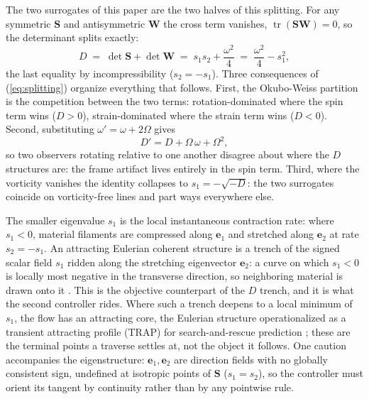 \documentclass[lettersize,journal]{IEEEtran}
\begin{document}
The two surrogates of this paper are the two halves of this splitting.
For any symmetric $\mathbf{S}$ and antisymmetric $\mathbf{W}$ the cross
term vanishes, $\operatorname{tr}(\mathbf{S}\mathbf{W}) = 0$, so the
determinant splits exactly:
\begin{equation}
    D \;=\; \det\mathbf{S} + \det\mathbf{W}
      \;=\; s_1 s_2 + \frac{\omega^2}{4}
      \;=\; \frac{\omega^2}{4} - s_1^2,
    \label{eq:splitting}
\end{equation}
the last equality by incompressibility ($s_2 = -s_1$). Three
consequences of (\ref{eq:splitting}) organize everything that follows.
First, the Okubo-Weiss partition is the competition between the two
terms: rotation-dominated where the spin term wins ($D > 0$),
strain-dominated where the strain term wins ($D < 0$). Second,
substituting $\omega' = \omega + 2\Omega$ gives
\begin{equation}
    D' = D + \Omega\,\omega + \Omega^2,
    \label{eq:D_not_objective}
\end{equation}
so two observers rotating relative to one another disagree about where
the $D$ structures are: the frame artifact lives entirely in the spin
term. Third, where the vorticity vanishes the identity collapses to
$s_1 = -\sqrt{-D}$: the two surrogates coincide on vorticity-free
lines and part ways everywhere else.

The smaller eigenvalue $s_1$ is the local instantaneous contraction
rate: where $s_1 < 0$, material filaments are compressed along
$\mathbf{e}_1$ and stretched along $\mathbf{e}_2$ at rate $s_2 = -s_1$.
An attracting Eulerian coherent structure is a trench of the signed
scalar field $s_1$ ridden along the stretching eigenvector
$\mathbf{e}_2$: a curve on which $s_1 < 0$ is locally most negative in
the transverse direction, so neighboring material is drawn onto it
\cite{17}. This is the objective counterpart of the $D$ trench, and it
is what the second controller rides. Where such a trench deepens to a
local minimum of $s_1$, the flow has an attracting core, the Eulerian
structure operationalized as a transient attracting profile (TRAP) for
search-and-rescue prediction \cite{36}; these are the terminal points a
traverse settles at, not the object it follows. One caution accompanies
the eigenstructure: $\mathbf{e}_1, \mathbf{e}_2$ are direction fields
with no globally consistent sign, undefined at isotropic points of
$\mathbf{S}$ ($s_1 = s_2$), so the controller must orient its tangent by
continuity rather than by any pointwise rule.
\end{document}
